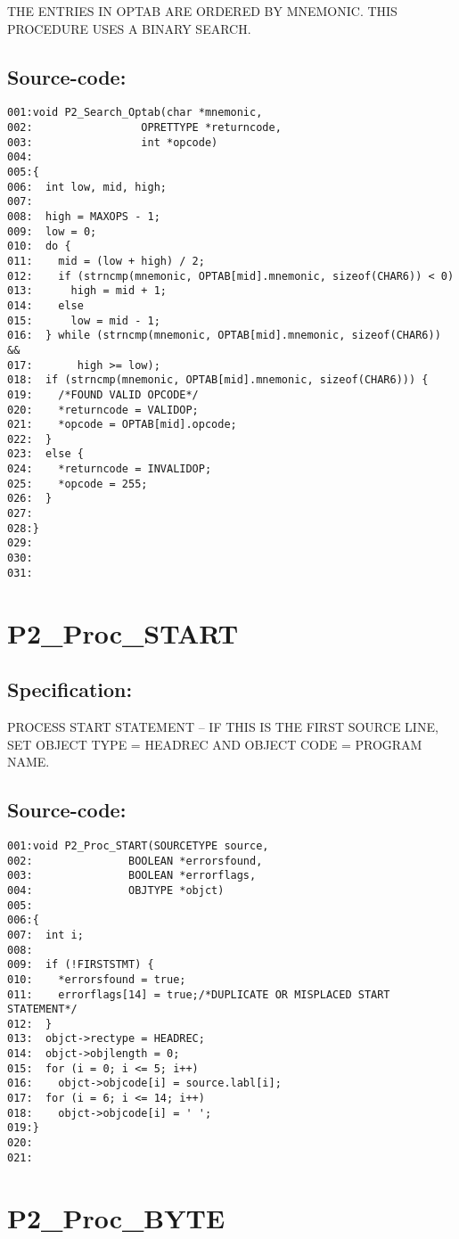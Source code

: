 THE ENTRIES IN OPTAB ARE ORDERED BY MNEMONIC. THIS PROCEDURE USES A BINARY
SEARCH.
\subsection*{Source-code:}
\begin{verbatim}
001:void P2_Search_Optab(char *mnemonic,
002:                 OPRETTYPE *returncode,
003:                 int *opcode)
004:
005:{
006:  int low, mid, high;
007:
008:  high = MAXOPS - 1;
009:  low = 0;
010:  do {
011:    mid = (low + high) / 2;
012:    if (strncmp(mnemonic, OPTAB[mid].mnemonic, sizeof(CHAR6)) < 0)
013:      high = mid + 1;
014:    else
015:      low = mid - 1;
016:  } while (strncmp(mnemonic, OPTAB[mid].mnemonic, sizeof(CHAR6)) &&
017:       high >= low);
018:  if (strncmp(mnemonic, OPTAB[mid].mnemonic, sizeof(CHAR6))) {
019:    /*FOUND VALID OPCODE*/
020:    *returncode = VALIDOP;
021:    *opcode = OPTAB[mid].opcode;
022:  } 
023:  else {
024:    *returncode = INVALIDOP;
025:    *opcode = 255;
026:  }
027:
028:}
029:
030:
031:
\end{verbatim}
\section{P2\_Proc\_START}
\subsection*{Specification:}
PROCESS START STATEMENT -- IF THIS IS THE FIRST SOURCE LINE, SET OBJECT TYPE
= HEADREC AND OBJECT CODE = PROGRAM NAME.
\subsection*{Source-code:}
\begin{verbatim}
001:void P2_Proc_START(SOURCETYPE source,
002:               BOOLEAN *errorsfound,
003:               BOOLEAN *errorflags,
004:               OBJTYPE *objct)
005:
006:{
007:  int i;
008:  
009:  if (!FIRSTSTMT) {
010:    *errorsfound = true;
011:    errorflags[14] = true;/*DUPLICATE OR MISPLACED START STATEMENT*/
012:  }
013:  objct->rectype = HEADREC;
014:  objct->objlength = 0;
015:  for (i = 0; i <= 5; i++)
016:    objct->objcode[i] = source.labl[i];
017:  for (i = 6; i <= 14; i++)
018:    objct->objcode[i] = ' ';
019:}
020:
021:
\end{verbatim}
\section{P2\_Proc\_BYTE}
